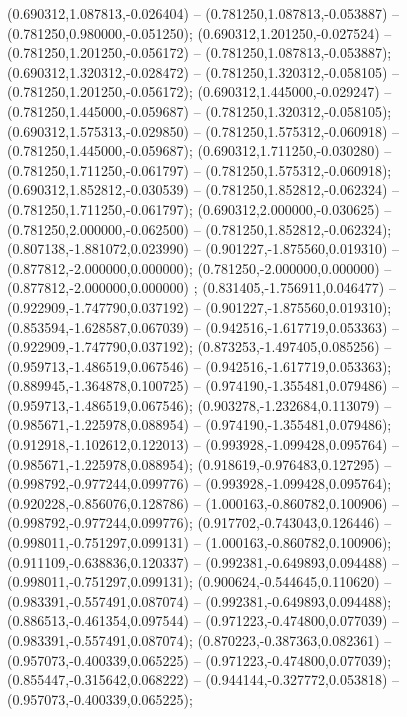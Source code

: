  (0.690312,1.087813,-0.026404) -- (0.781250,1.087813,-0.053887) -- (0.781250,0.980000,-0.051250);
 (0.690312,1.201250,-0.027524) -- (0.781250,1.201250,-0.056172) -- (0.781250,1.087813,-0.053887);
 (0.690312,1.320312,-0.028472) -- (0.781250,1.320312,-0.058105) -- (0.781250,1.201250,-0.056172);
 (0.690312,1.445000,-0.029247) -- (0.781250,1.445000,-0.059687) -- (0.781250,1.320312,-0.058105);
 (0.690312,1.575313,-0.029850) -- (0.781250,1.575312,-0.060918) -- (0.781250,1.445000,-0.059687);
 (0.690312,1.711250,-0.030280) -- (0.781250,1.711250,-0.061797) -- (0.781250,1.575312,-0.060918);
 (0.690312,1.852812,-0.030539) -- (0.781250,1.852812,-0.062324) -- (0.781250,1.711250,-0.061797);
 (0.690312,2.000000,-0.030625) -- (0.781250,2.000000,-0.062500) -- (0.781250,1.852812,-0.062324);
 (0.807138,-1.881072,0.023990) -- (0.901227,-1.875560,0.019310) -- (0.877812,-2.000000,0.000000);
 (0.781250,-2.000000,0.000000) -- (0.877812,-2.000000,0.000000) ;
 (0.831405,-1.756911,0.046477) -- (0.922909,-1.747790,0.037192) -- (0.901227,-1.875560,0.019310);
 (0.853594,-1.628587,0.067039) -- (0.942516,-1.617719,0.053363) -- (0.922909,-1.747790,0.037192);
 (0.873253,-1.497405,0.085256) -- (0.959713,-1.486519,0.067546) -- (0.942516,-1.617719,0.053363);
 (0.889945,-1.364878,0.100725) -- (0.974190,-1.355481,0.079486) -- (0.959713,-1.486519,0.067546);
 (0.903278,-1.232684,0.113079) -- (0.985671,-1.225978,0.088954) -- (0.974190,-1.355481,0.079486);
 (0.912918,-1.102612,0.122013) -- (0.993928,-1.099428,0.095764) -- (0.985671,-1.225978,0.088954);
 (0.918619,-0.976483,0.127295) -- (0.998792,-0.977244,0.099776) -- (0.993928,-1.099428,0.095764);
 (0.920228,-0.856076,0.128786) -- (1.000163,-0.860782,0.100906) -- (0.998792,-0.977244,0.099776);
 (0.917702,-0.743043,0.126446) -- (0.998011,-0.751297,0.099131) -- (1.000163,-0.860782,0.100906);
 (0.911109,-0.638836,0.120337) -- (0.992381,-0.649893,0.094488) -- (0.998011,-0.751297,0.099131);
 (0.900624,-0.544645,0.110620) -- (0.983391,-0.557491,0.087074) -- (0.992381,-0.649893,0.094488);
 (0.886513,-0.461354,0.097544) -- (0.971223,-0.474800,0.077039) -- (0.983391,-0.557491,0.087074);
 (0.870223,-0.387363,0.082361) -- (0.957073,-0.400339,0.065225) -- (0.971223,-0.474800,0.077039);
 (0.855447,-0.315642,0.068222) -- (0.944144,-0.327772,0.053818) -- (0.957073,-0.400339,0.065225);
